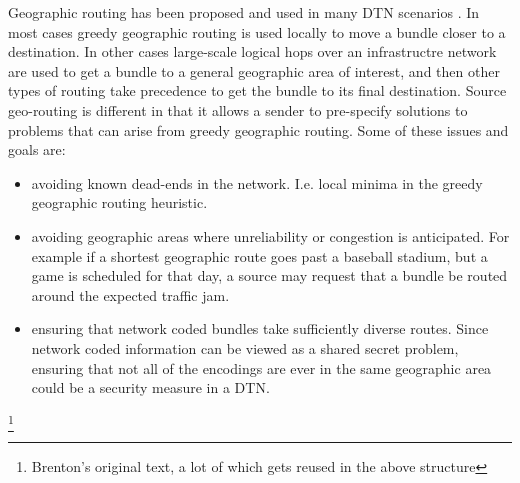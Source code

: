 {Geographic routing has been proposed and used in many DTN scenarios \cite{paper1,paper2,paper3,paper4,paper5,paper6}.  In most cases greedy geographic routing is used locally to move a bundle closer to a destination.  In other cases large-scale logical hops over an infrastructre network are used to get a bundle to a general geographic area of interest, and then other types of routing take precedence to get the bundle to its final destination.  Source geo-routing is different in that it allows a sender to pre-specify solutions to problems that can arise from greedy geographic routing.  Some of these issues and goals are:
\begin{itemize}
  \item avoiding known dead-ends in the network. I.e. local minima in the greedy geographic routing heuristic.
  \item avoiding geographic areas where unreliability or congestion is anticipated.  For example if a shortest geographic route goes past a baseball stadium, but a game is scheduled for that day, a source may request that a bundle be routed around the expected traffic jam.
  \item ensuring that network coded bundles take sufficiently diverse routes.  Since network coded information can be viewed as a shared secret problem, ensuring that not all of the encodings are ever in the same geographic area could be a security measure in a DTN.
\end{itemize}
\footnote{Brenton's original text, a lot of which gets reused in the above structure}
}